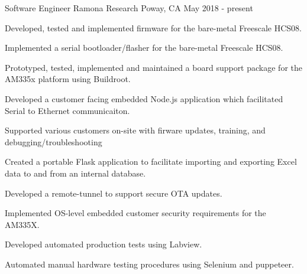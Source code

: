\begin{cventries}
  \cventry
    {Software Engineer} %
    {Ramona Research} %
    {Poway, CA} %
    {May 2018 - present} %
    {
      \begin{cvitems} %
      \item Developed, tested and implemented firmware for the bare-metal Freescale HCS08.
      \item Implemented a serial bootloader/flasher for the bare-metal Freescale HCS08. 
      \item Prototyped, tested, implemented and maintained a board support package for the AM335x platform using Buildroot.
      \item Developed a customer facing embedded Node.js application which facilitated Serial to Ethernet communicaiton.
      \item Supported various customers on-site with firware updates, training, and debugging/troubleshooting
      \item Created a portable Flask application to facilitate importing and exporting Excel data to and from an internal database. 
      \item Developed a remote-tunnel to support secure OTA updates.
      \item Implemented OS-level embedded customer security requirements for the AM335X.
      \item Developed automated production tests using Labview.
      \item Automated manual hardware testing procedures using Selenium and puppeteer.
      \end{cvitems}
    }


\end{cventries}
